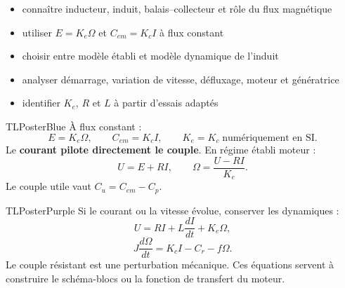\documentclass[10pt,a3paper]{article}
\begin{document}
\vspace{2mm}
\begin{minipage}[t]{0.60\linewidth}
\begin{TLPosterSavoirs}
\begin{itemize}
  \item connaître inducteur, induit, balais--collecteur et rôle du flux magnétique
  \item utiliser $E=K_e\Omega$ et $C_{em}=K_cI$ à flux constant
  \item choisir entre modèle établi et modèle dynamique de l'induit
  \item analyser démarrage, variation de vitesse, défluxage, moteur et génératrice
  \item identifier $K_e$, $R$ et $L$ à partir d'essais adaptés
\end{itemize}
\end{TLPosterSavoirs}
\end{minipage}\hfill
\begin{minipage}[t]{0.37\linewidth}
\end{minipage}
\vfill
\begin{minipage}[t]{0.49\linewidth}
\begin{TLPosterBloc}{TLPosterBlue}
À flux constant :
\[
E=K_e\Omega,\qquad C_{em}=K_cI,\qquad K_e=K_c\;\text{numériquement en SI}.
\]
Le \textbf{courant pilote directement le couple}. En régime établi moteur :
\[
U=E+RI,\qquad \Omega=\frac{U-RI}{K_e}.
\]
Le couple utile vaut $C_u=C_{em}-C_p$.
\end{TLPosterBloc}
\begin{TLPosterBloc}{TLPosterPurple}
Si le courant ou la vitesse évolue, conserver les dynamiques :
\[
U=RI+L\frac{dI}{dt}+K_e\Omega,
\]
\[
J\frac{d\Omega}{dt}=K_cI-C_r-f\Omega.
\]
Le couple résistant est une perturbation mécanique. Ces équations servent à construire le schéma-blocs ou la fonction de transfert du moteur.
\end{TLPosterBloc}
\end{minipage}\hfill
\end{document}
